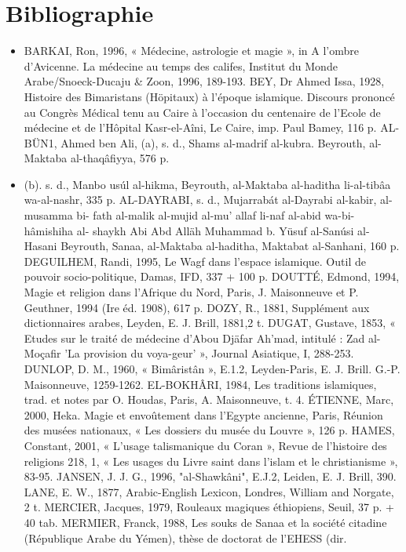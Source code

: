 \section{Bibliographie}
\begin{itemize}
    \item 

BARKAI, Ron, 1996, « Médecine, astrologie et magie », in A l'ombre d'Avicenne. La médecine au temps des califes, Institut du Monde
Arabe/Snoeck-Ducaju & Zoon, 1996, 189-193.
BEY, Dr Ahmed Issa, 1928, Histoire des Bimaristans (Höpitaux) à l'époque islamique. Discours prononcé au Congrès Médical tenu au Caire à l'occasion du centenaire de l'Ecole de médecine et de
l'Hôpital Kasr-el-Aîni, Le Caire, imp. Paul Bamey, 116 p.
AL-BÜN1, Ahmed ben Ali, (a), s. d., Shams al-madrif al-kubra.
Beyrouth, al-Maktaba al-thaqâfiyya, 576 p.
\item (b). s. d., Manbo usúl al-hikma, Beyrouth, al-Maktaba al-haditha
li-al-tibâa wa-al-nashr, 335 p.
AL-DAYRABI, s. d., Mujarrabát al-Dayrabi al-kabir, al-musamma bi-
fath al-malik al-mujid al-mu' allaf li-naf al-abid wa-bi-hâmishiha al-
shaykh Abi Abd Alläh Muhammad b. Yüsuf al-Sanúsi al-Hasani
Beyrouth, Sanaa, al-Maktaba al-haditha, Maktabat al-Sanhani, 160 p.
DEGUILHEM, Randi, 1995, Le Wagf dans l'espace islamique. Outil de pouvoir socio-politique, Damas, IFD, 337 + 100 p.
DOUTTÉ, Edmond, 1994, Magie et religion dans l'Afrique du Nord, Paris, J. Maisonneuve et P. Geuthner, 1994 (Ire éd. 1908), 617 p.
DOZY, R., 1881, Supplément aux dictionnaires arabes, Leyden, E. J.
Brill, 1881,2 t.
DUGAT, Gustave, 1853, « Etudes sur le traité de médecine d'Abou
Djäfar Ah'mad, intitulé : Zad al-Moçafir 'La provision du voya-geur' », Journal Asiatique, I, 288-253.
DUNLOP, D. M., 1960, « Bimâristân », E.1.2, Leyden-Paris, E. J. Brill.
G.-P. Maisonneuve, 1259-1262.
EL-BOKHÂRI, 1984, Les traditions islamiques, trad. et notes par O.
Houdas, Paris, A. Maisonneuve, t. 4.
ÉTIENNE, Marc, 2000, Heka. Magie et envoûtement dans l'Egypte ancienne, Paris, Réunion des musées nationaux, « Les dossiers du musée du Louvre », 126 p.
HAMES, Constant, 2001, « L'usage talismanique du Coran », Revue de l'histoire des religions 218, 1, « Les usages du Livre saint dans l'islam et le christianisme », 83-95.
JANSEN, J. J. G., 1996, "al-Shawkâni", E.J.2, Leiden, E. J. Brill, 390.
LANE, E. W., 1877, Arabic-English Lexicon, Londres, William and
Norgate, 2 t.
MERCIER, Jacques, 1979, Rouleaux magiques éthiopiens, Seuil, 37 p. +
40 tab.
MERMIER, Franck, 1988, Les souks de Sanaa et la société citadine (République Arabe du Yémen), thèse de doctorat de l'EHESS (dir.

\end{itemize}
